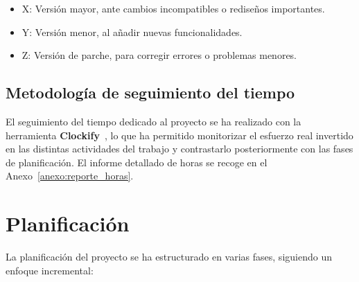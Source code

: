 \begin{itemize}
    \item X: Versión mayor, ante cambios incompatibles o rediseños importantes.
    \item Y: Versión menor, al añadir nuevas funcionalidades.
    \item Z: Versión de parche, para corregir errores o problemas menores.
\end{itemize}

\subsection{Metodología de seguimiento del tiempo}

El seguimiento del tiempo dedicado al proyecto se ha realizado con la herramienta \textbf{Clockify}~\cite{clockify}, lo que ha permitido monitorizar el esfuerzo real invertido en las distintas actividades del trabajo y contrastarlo posteriormente con las fases de planificación. El informe detallado de horas se recoge en el Anexo~\ref{anexo:reporte_horas}.

\section{Planificación}

La planificación del proyecto se ha estructurado en varias fases, siguiendo un enfoque incremental:

